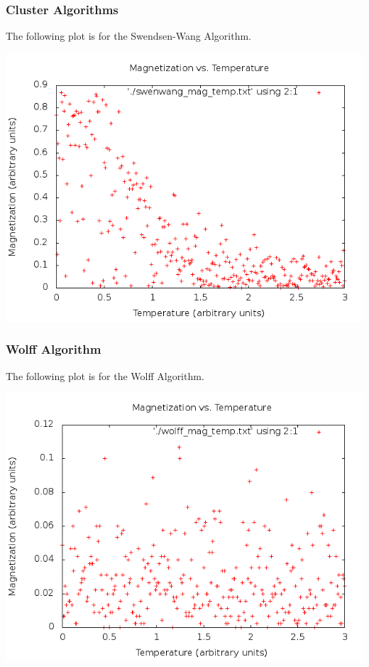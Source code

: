 \documentclass[11pt,letterpaper,fleqn]{article}
\begin{document}
\subsubsection*{Cluster Algorithms}

The following plot is for the Swendsen-Wang Algorithm.

\includegraphics[width=1\textwidth]{images/swenwang_mag_temp.png}




\subsubsection*{Wolff Algorithm}

The following plot is for the Wolff Algorithm.

\includegraphics[width=1\textwidth]{images/wolff_mag_temp.png}
\end{document}
